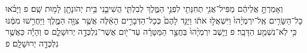 \documentclass{openreader}
\begin{document}
וְאָמַרְתָּ֣ אֲלֵיהֶ֔ם מַפִּיל־אֲנִ֥י תְחִנָּתִ֖י לִפְנֵ֣י הַמֶּ֑לֶךְ לְבִלְתִּ֧י הֲשִׁיבֵ֛נִי בֵּ֥ית יְהֹונָתָ֖ן לָמ֥וּת שָֽׁם׃ פ 
וַיָּבֹ֨אוּ כָל־הַשָּׂרִ֤ים אֶֽל־יִרְמְיָ֨הוּ֙ וַיִּשְׁאֲל֣וּ אֹתֹ֔ו וַיַּגֵּ֤ד לָהֶם֙ כְּכָל־הַדְּבָרִ֣ים הָאֵ֔לֶּה אֲשֶׁ֥ר צִוָּ֖ה הַמֶּ֑לֶךְ וַיַּחֲרִ֣שׁוּ מִמֶּ֔נּוּ כִּ֥י לֹֽא־נִשְׁמַ֖ע הַדָּבָֽר׃ פ 
וַיֵּ֤שֶׁב יִרְמְיָ֨הוּ֙ בַּחֲצַ֣ר הַמַּטָּרָ֔ה עַד־יֹ֖ום אֲשֶׁר־נִלְכְּדָ֣ה יְרוּשָׁלִָ֑ם ס וְהָיָ֕ה כַּאֲשֶׁ֥ר נִלְכְּדָ֖ה יְרוּשָׁלִָֽם׃ פ 
\end{document}
